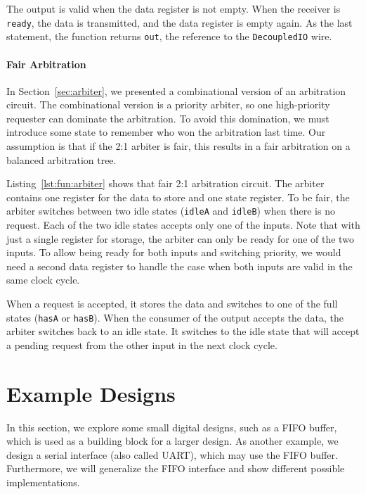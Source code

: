 \documentclass[%
    10pt,
    headinclude, footexclude,
    openright, %
    notitlepage,
    cleardoubleempty,
    headsepline,
    pointlessnumbers,
    bibtotoc, idxtotoc,
    ]{scrbook}
\newcommand{\code}[1]{{\lstinline[basicstyle=\small\ttfamily]{#1}}}
\begin{document}
The output is valid when the data register is not empty. When the receiver is \code{ready},
the data is transmitted, and the data register is empty again.
As the last statement, the function returns \code{out}, the reference to the \code{DecoupledIO}
wire.


\subsubsection{Fair Arbitration}

In Section~\ref{sec:arbiter}, we presented a combinational version of an arbitration circuit.
The combinational version is a priority arbiter, so one high-priority requester can
dominate the arbitration.
To avoid this domination, we must introduce some state to remember who won the arbitration last time.
Our assumption is that if the 2:1 arbiter is fair, this results in a fair
arbitration on a balanced arbitration tree.


Listing~\ref{lst:fun:arbiter} shows that fair 2:1 arbitration circuit.
The arbiter contains one register for the data to store and one state register. To be fair, the arbiter
switches between two idle states (\code{idleA} and \code{idleB}) when there is no request.
Each of the two idle states accepts only one of the inputs. Note that with just a single register for
storage, the arbiter can only be ready for one of the two inputs. To allow being ready for both inputs
and switching priority, we would need a second data register to handle the case when both inputs
are valid in the same clock cycle.

When a request is accepted, it stores the data and switches to one of the full states (\code{hasA}
or \code{hasB}).
When the consumer of the output accepts the data, the arbiter switches back to an idle state.
It switches to the idle state that will accept a pending request from the other input
in the next clock cycle.



\chapter{Example Designs}

In this section, we explore some small digital designs, such as
a FIFO buffer, which is used as a building block for a larger design.
As another example, we design a serial interface (also called UART),
which may use the FIFO buffer. Furthermore, we will generalize
the FIFO interface and show different possible implementations.
\end{document}
